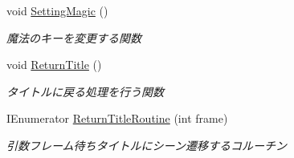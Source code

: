 \begin{DoxyCompactItemize}
void \hyperlink{class_pause_ac6996ec18e769c7af8b0f29a4d78e8d7}{Setting\+Magic} ()
\begin{DoxyCompactList}\small\item\em 魔法のキーを変更する関数 \end{DoxyCompactList}\item 
void \hyperlink{class_pause_a132605f67bd5ff4dacdec6adfcb104f0}{Return\+Title} ()
\begin{DoxyCompactList}\small\item\em タイトルに戻る処理を行う関数 \end{DoxyCompactList}\item 
I\+Enumerator \hyperlink{class_pause_ac99fd26d97c3fb53f035c64a7f77c7d0}{Return\+Title\+Routine} (int frame)
\begin{DoxyCompactList}\small\item\em 引数フレーム待ちタイトルにシーン遷移するコルーチン \end{DoxyCompactList}\end{DoxyCompactItemize}
